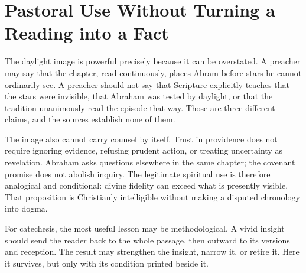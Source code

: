 \section{Pastoral Use Without Turning a Reading into a Fact}

The daylight image is powerful precisely because it can be overstated. A
preacher may say that the chapter, read continuously, places Abram before stars
he cannot ordinarily see. A preacher should not say that Scripture explicitly
teaches that the stars were invisible, that Abraham was tested by daylight, or
that the tradition unanimously read the episode that way. Those are three
different claims, and the sources establish none of them.

The image also cannot carry counsel by itself. Trust in providence does not
require ignoring evidence, refusing prudent action, or treating uncertainty as
revelation. Abraham asks questions elsewhere in the same chapter; the covenant
promise does not abolish inquiry. The legitimate spiritual use is therefore
analogical and conditional: divine fidelity can exceed what is presently
visible. That proposition is Christianly intelligible without making a disputed
chronology into dogma.

For catechesis, the most useful lesson may be methodological. A vivid insight
should send the reader back to the whole passage, then outward to its versions
and reception. The result may strengthen the insight, narrow it, or retire it.
Here it survives, but only with its condition printed beside it.


